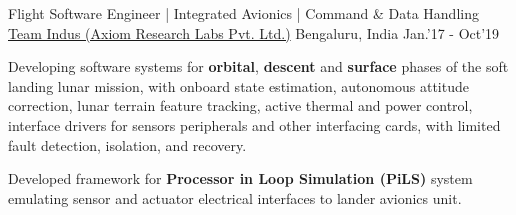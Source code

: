\begin{cventries}
	\cventry
	{\large Flight Software Engineer | Integrated Avionics | Command \& Data Handling}
	{\href{http://www.teamindus.in/}{\large Team Indus (Axiom Research Labs Pvt. Ltd.)}}
	{\large Bengaluru, India}
	{\large Jan.'17 - Oct'19}
	{
		\begin{cvitems}
		        \item{\large Developing software systems for \textbf{orbital}, \textbf{descent} and \textbf{surface} phases of the soft landing lunar mission, with onboard state estimation, autonomous attitude correction, lunar terrain feature tracking, active thermal and power control, interface drivers for sensors peripherals and other interfacing cards, with limited fault detection, isolation, and recovery.}
			\item{\large Developed framework for \textbf{Processor in Loop Simulation (PiLS)} system emulating sensor and actuator electrical interfaces to lander avionics unit.}
		\end{cvitems}
	}
\end{cventries}
